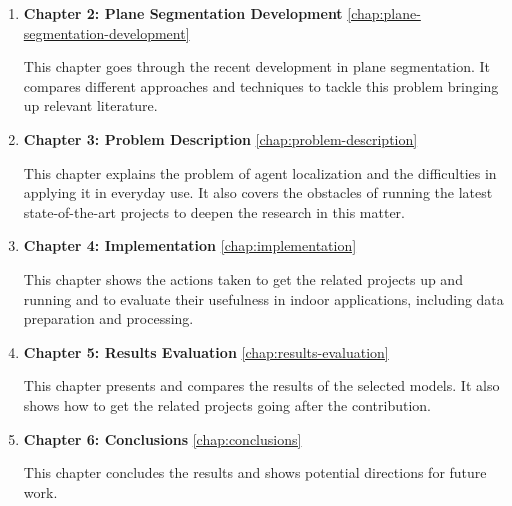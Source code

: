 \begin{enumerate}
\item \textbf{Chapter 2: Plane Segmentation Development} \ref{chap:plane-segmentation-development}

This chapter goes through the recent development in plane segmentation.
It compares different approaches and techniques to tackle this problem bringing up relevant literature.

\item \textbf{Chapter 3: Problem Description} \ref{chap:problem-description}

This chapter explains the problem of agent localization and the difficulties in applying it in everyday use.
It also covers the obstacles of running the latest state-of-the-art projects to deepen the research in this matter.

\item \textbf{Chapter 4: Implementation} \ref{chap:implementation}

This chapter shows the actions taken to get the related projects up and running and to evaluate their usefulness in indoor applications,
including data preparation and processing.

\item \textbf{Chapter 5: Results Evaluation} \ref{chap:results-evaluation}

This chapter presents and compares the results of the selected models.
It also shows how to get the related projects going after the contribution.

\item \textbf{Chapter 6: Conclusions} \ref{chap:conclusions}

This chapter concludes the results and shows potential directions for future work.

\end{enumerate}
